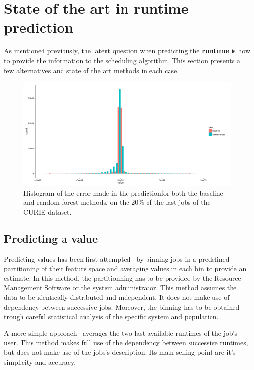 \documentclass{article}
\begin{document}
\section{State of the art in \textbf{runtime} prediction}

As mentioned previously, the latent question when predicting the \textbf{runtime} is how to provide the information to the scheduling algorithm. This section presents a few alternatives and state of the art methods in each case.

\begin{figure}[b]
  \centering
  \includegraphics[width=\textwidth]{../../truc.png}
  \caption{Histogram of the error made in the predictionfor both the baseline and random forest methods, on the 20\% of the last jobs of the CURIE dataset.}
  \label{fig:ratio}
\end{figure}


\subsection{Predicting a value}
\label{sub:predicting_a_value}

Predicting values has been first attempted~\cite{gibbons} by binning jobs in a predefined partitioning of their feature space and averaging values in each bin to provide an estimate. In this method, the partitionning has to be provided by the Resource Management Software or the system administrator. This method assumes the data to be identically distributed and independent. It does not make use of dependency between successive jobs. Moreover, the binning has to be obtained trough careful statistical analysis of the specific system and population.

A more simple approach~\cite{tsafir} averages the two last available runtimes of the job's user.
This method makes full use of the dependency between successive runtimes, but does not make use of the jobs's description. Its main selling point are it's simplicity and accuracy.
\end{document}
